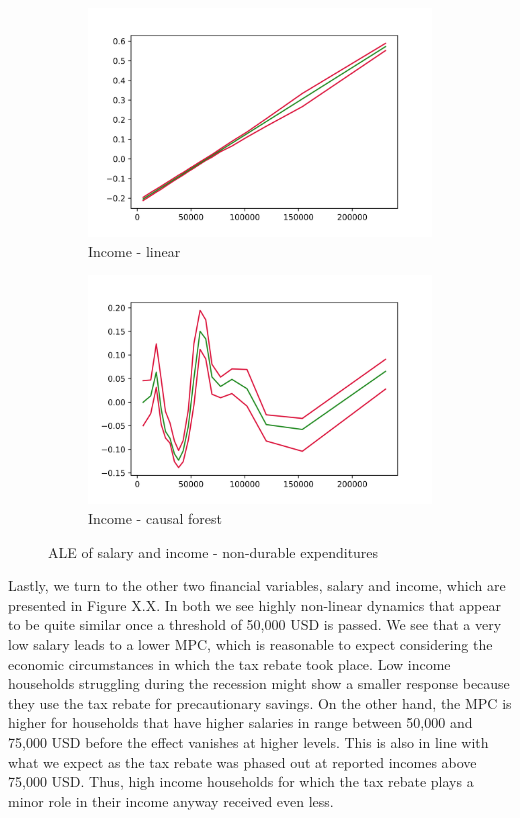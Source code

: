 \begin{figure}[t]
    \begin{subfigure}{0.5\textwidth}
        \includegraphics[width=\textwidth]{figures/ALE/chNDexp/spec3_linear_FINCBTXM.png}
        \caption{Income - linear}
    \end{subfigure}\hfill
    \begin{subfigure}{0.5\textwidth}
        \includegraphics[width=\textwidth]{figures/ALE/chNDexp/spec3_cf_FINCBTXM.png}
        \caption{Income - causal forest}
    \end{subfigure}\hfill
    \caption{ALE of salary and income - non-durable expenditures}
\end{figure}
Lastly, we turn to the other two financial variables, salary and income, which are presented in Figure X.X. In both we see highly non-linear dynamics that appear to be quite similar once a threshold of 50,000 USD is passed. We see that a very low salary leads to a lower MPC, which is reasonable to expect considering the economic circumstances in which the tax rebate took place. Low income households struggling during the recession might show a smaller response because they use the tax rebate for precautionary savings. On the other hand, the MPC is higher for households that have higher salaries in range between 50,000 and 75,000 USD before the effect vanishes at higher levels. This is also in line with what we expect as the tax rebate was phased out at reported incomes above 75,000 USD. Thus, high income households for which the tax rebate plays a minor role in their income anyway received even less. 